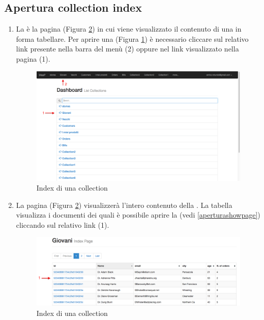 	\subsection{Apertura collection index} %
	\label{aperturacollectionindex}
		\begin{enumerate}
			\item La  è la pagina (Figura \ref{fig:collection}) in cui viene visualizzato il contenuto di una  in forma tabellare. Per aprire una  (Figura \ref{fig:aperturaCollection}) è necessario cliccare sul relativo link presente nella barra del menù (2) oppure nel link visualizzato nella pagina  (1).

			\begin{figure}[H]
				\centering \includegraphics[width=1\textwidth]{img/aperturaCollection.png}
			\caption{ \label{fig:aperturaCollection} Index di una collection}
			\end{figure}


			\item La pagina  (Figura \ref{fig:collection}) visualizzerà l'intero contenuto della . La tabella visualizza i documenti dei quali è possibile aprire la  (vedi \ref{aperturashowpage}) cliccando sul relativo link (1).

			\begin{figure}[H]
				\centering \includegraphics[width=1\textwidth]{img/collection.png}
			\caption{ \label{fig:collection} Index di una collection}
			\end{figure}
		\end{enumerate}

